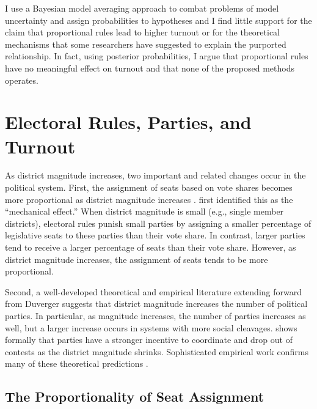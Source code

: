 \documentclass[12pt]{article}
\begin{document}
I use a Bayesian model averaging approach to combat problems of model uncertainty and assign probabilities to hypotheses \citep{MontgomeryNyhan2010} and I find little support for the claim that proportional rules lead to higher turnout or for the theoretical mechanisms that some researchers have suggested to explain the purported relationship. In fact, using posterior probabilities, I argue that proportional rules have no meaningful effect on turnout and that none of the proposed methods operates.

\section*{Electoral Rules, Parties, and Turnout}

As district magnitude increases, two important and related changes occur in the political system. First, the assignment of seats based on vote shares becomes more proportional as district magnitude increases \citep{Cox1997, Benoit2000}. \cite{Duverger1954} first identified this as the ``mechanical effect.'' When district magnitude is small (e.g., single member districts), electoral rules punish small parties by assigning a smaller percentage of legislative seats to these parties than their vote share. In contrast, larger parties tend to receive a larger percentage of seats than their vote share. However, as district magnitude increases, the assignment of seats tends to be more proportional. 

Second, a well-developed theoretical and empirical literature extending forward from Duverger suggests that district magnitude increases the number of political parties. In particular, as magnitude increases, the number of parties increases as well, but a larger increase occurs in systems with more social cleavages.   \cite{Cox1999} shows formally that parties have a stronger incentive to coordinate and drop out of contests as the district magnitude shrinks. Sophisticated empirical work confirms many of these theoretical predictions \citep[e.g.][]{ClarkGolder2006}.

\subsection*{The Proportionality of Seat Assignment}
\end{document}
